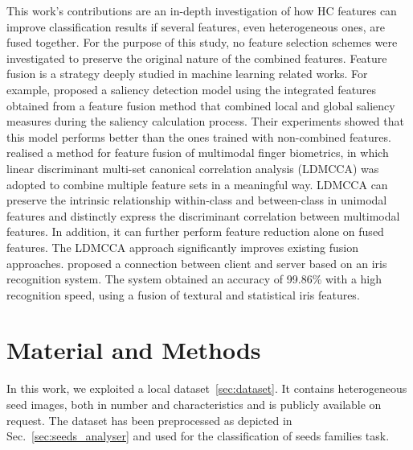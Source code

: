 \documentclass[twocolumn]{svjour3}           %
\begin{document}
This work's contributions are an in-depth investigation of how HC features can improve classification results if several features, even heterogeneous ones, are fused together. For the purpose of this study, no feature selection schemes were investigated to preserve the original nature of the combined features. Feature fusion is a strategy deeply studied in machine learning related works. For example, \cite{jing2014saliency} proposed a saliency detection model using the integrated features obtained from a feature fusion method that combined local and global saliency measures during the saliency calculation process. Their experiments showed that this model performs better than the ones trained with non-combined features. \cite{peng2015linear} realised a method for feature fusion of multimodal finger biometrics, in which linear discriminant multi-set canonical correlation analysis (LDMCCA) was adopted to combine multiple feature sets in a meaningful way. LDMCCA can preserve the intrinsic relationship within-class and between-class in unimodal features and distinctly express the discriminant correlation between multimodal features. In addition, it can further perform feature reduction alone on fused features. The LDMCCA approach significantly improves existing fusion approaches. \cite{gad2019iot} proposed a connection between client and server based on an iris recognition system. The system obtained an accuracy of 99.86\% with a high recognition speed, using a fusion of textural and statistical iris features.


\section{Material and Methods}
\label{sec:materials_methods}
In this work, we exploited a local dataset~\ref{sec:dataset}. It contains heterogeneous seed images, both in number and characteristics and is publicly available on request.
The dataset has been preprocessed as depicted in Sec.~\ref{sec:seeds_analyser} and used for the classification of seeds families task.
\end{document}
